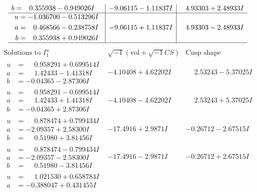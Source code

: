 \documentclass[1p]{elsarticle_modified}
\theoremstyle{definition}
\newcommand{\I}{\sqrt{-1}}
\begin{document}
$$\begin{array}{c|c|c}
\begin{aligned}
b &= \phantom{-}0.355938 - 0.949026 I\end{aligned}
 & -9.06115 - 1.11837 I & \phantom{-}4.93303 + 2.48933 I \\ \hline\begin{aligned}
u &= -1.036700 - 0.513296 I \\
a &= \phantom{-}0.468566 - 0.238758 I \\
b &= \phantom{-}0.355938 + 0.949026 I\end{aligned}
 & -9.06115 + 1.11837 I & \phantom{-}4.93303 - 2.48933 I\\
 \hline 
 \end{array}$$\newpage$$\begin{array}{c|c|c}  
\text{Solutions to }I^u_{1}& \I (\text{vol} + \sqrt{-1}CS) & \text{Cusp shape}\\
 \hline 
\begin{aligned}
u &= \phantom{-}0.958291 + 0.699514 I \\
a &= \phantom{-}1.42433 - 1.41318 I \\
b &= -0.04365 - 2.87306 I\end{aligned}
 & -4.10408 + 4.62202 I & \phantom{-}2.53243 - 5.37025 I \\ \hline\begin{aligned}
u &= \phantom{-}0.958291 - 0.699514 I \\
a &= \phantom{-}1.42433 + 1.41318 I \\
b &= -0.04365 + 2.87306 I\end{aligned}
 & -4.10408 - 4.62202 I & \phantom{-}2.53243 + 5.37025 I \\ \hline\begin{aligned}
u &= \phantom{-}0.878474 + 0.799434 I \\
a &= -2.09357 + 2.58300 I \\
b &= \phantom{-}0.51980 + 3.81456 I\end{aligned}
 & -17.4916 + 2.9871 I & -0.26712 - 2.67515 I \\ \hline\begin{aligned}
u &= \phantom{-}0.878474 - 0.799434 I \\
a &= -2.09357 - 2.58300 I \\
b &= \phantom{-}0.51980 - 3.81456 I\end{aligned}
 & -17.4916 - 2.9871 I & -0.26712 + 2.67515 I \\ \hline\begin{aligned}
u &= \phantom{-}1.021530 + 0.658784 I \\
a &= -0.388047 + 0.431455 I \\

\end{aligned}
\end{array}$$
\end{document}
